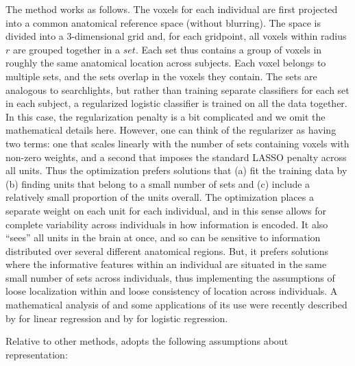 The method works as follows. The voxels for each individual are first projected into a common anatomical reference space (without blurring). The space is divided into a 3-dimensional grid and, for each gridpoint, all voxels within radius $r$ are grouped together in a $set$. Each set thus contains a group of voxels in roughly the same anatomical location across subjects. Each voxel belongs to multiple sets, and the sets overlap in the voxels they contain. The sets are analogous to searchlights, but rather than training separate classifiers for each set in each subject, a regularized logistic classifier is trained on all the data together. In this case, the regularization penalty is a bit complicated and we omit the mathematical details here. However, one can think of the regularizer as having two terms: one that scales linearly with the number of sets containing voxels with non-zero weights, and a second that imposes the standard LASSO penalty across all units. Thus the optimization prefers solutions that (a) fit the training data by (b) finding units that belong to a small number of sets and (c) include a relatively small proportion of the units overall. The optimization places a separate weight on each unit for each individual, and in this sense allows for complete variability across individuals in how information is encoded. It also ``sees'' all units in the brain at once, and so can be sensitive to information distributed over several different anatomical regions. But, it prefers solutions where the informative features within an individual are situated in the same small number of sets across individuals, thus implementing the assumptions of loose localization within and loose consistency of location across individuals. A mathematical analysis of \soslasso and some applications of its use were recently described by \cite{rao_sparse_2013} for linear regression and by \cite{raoML} for logistic regression. 

Relative to other methods, \soslasso adopts the following assumptions about representation:

